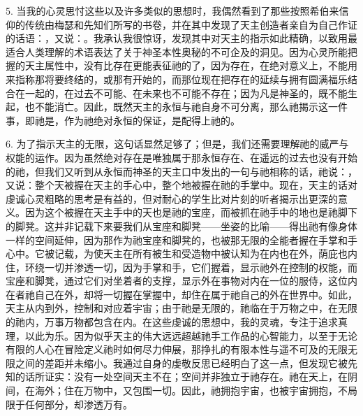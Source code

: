 5. 当我的心灵思忖这些以及许多类似的思想时，我偶然看到了那些按照希伯来信仰的传统由梅瑟和先知们所写的书卷，并在其中发现了天主创造者亲自为自己作证的话语：，又说：。我承认我很惊讶，发现其中对天主的指示如此精确，以致用最适合人类理解的术语表达了关于神圣本性奥秘的不可企及的洞见。因为心灵所能把握的天主属性中，没有比存在更能表征祂的了，因为存在，在绝对意义上，不能用来指称那将要终结的，或那有开始的，而那位现在把存在的延续与拥有圆满福乐结合在一起的，在过去不可能、在未来也不可能不存在；因为凡是神圣的，既不能生起，也不能消亡。因此，既然天主的永恒与祂自身不可分离，那么祂揭示这一件事，即祂是，作为祂绝对永恒的保证，是配得上祂的。\par

6. 为了指示天主的无限，这句话显然足够了；但是，我们还需要理解祂的威严与权能的运作。因为虽然绝对存在是唯独属于那永恒存在、在遥远的过去也没有开始的祂，但我们又听到从永恒而神圣的天主口中发出的一句与祂相称的话，祂说：，又说：整个天被握在天主的手心中，整个地被握在祂的手掌中。现在，天主的话对虔诚心灵粗略的思考是有益的，但对耐心的学生比对片刻的听者揭示出更深的意义。因为这个被握在天主手中的天也是祂的宝座，而被抓在祂手中的地也是祂脚下的脚凳。这并非记载下来要我们从宝座和脚凳——坐姿的比喻——得出祂有像身体一样的空间延伸，因为那作为祂宝座和脚凳的，也被那无限的全能者握在手掌和手心中。它被记载，为使天主在所有被生和受造物中被认知为在内也在外，荫庇也内住，环绕一切并渗透一切，因为手掌和手，它们握着，显示祂外在控制的权能，而宝座和脚凳，通过它们对坐着者的支撑，显示外在事物对内在一位的服侍，这位内在者祂自己在外，却将一切握在掌握中，却住在属于祂自己的外在世界中。如此，天主从内到外，控制和对应着宇宙；由于祂是无限的，祂临在于万物之中，在无限的祂内，万事万物都包含在内。在这些虔诚的思想中，我的灵魂，专注于追求真理，以此为乐。因为似乎天主的伟大远远超越祂手工作品的心智能力，以至于无论有限的人心在冒险定义祂时如何尽力伸展，那挣扎的有限本性与遥不可及的无限无限之间的差距并未缩小。我通过自身的虔敬反思已经明白了这一点，但发现它被先知的话所证实：没有一处空间天主不在；空间并非独立于祂存在。祂在天上，在阴间，在海外；住在万物中，又包围一切。因此，祂拥抱宇宙，也被宇宙拥抱，不局限于任何部分，却渗透万有。\par

